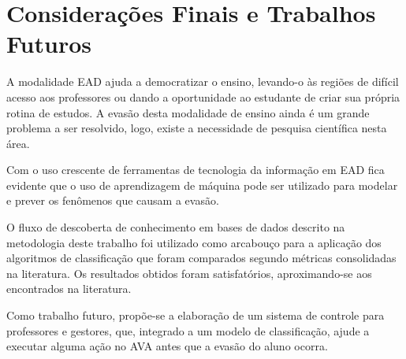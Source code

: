 \chapter{Considerações Finais e Trabalhos Futuros}

A modalidade EAD ajuda a democratizar o ensino, levando-o às regiões de difícil
acesso aos professores ou dando a oportunidade ao estudante de criar sua própria
rotina de estudos. A evasão desta modalidade de ensino ainda é um grande
problema a ser resolvido, logo, existe a necessidade de pesquisa científica
nesta área.

Com o uso crescente de ferramentas de tecnologia da informação em EAD fica
evidente que o uso de aprendizagem de máquina pode ser utilizado para modelar e
prever os fenômenos que causam a evasão.

O fluxo de descoberta de conhecimento em bases de dados descrito na metodologia
deste trabalho foi utilizado como arcabouço para a aplicação dos algoritmos de
classificação que foram comparados segundo métricas consolidadas na literatura.
Os resultados obtidos foram satisfatórios, aproximando-se aos encontrados na
literatura.

Como trabalho futuro, propõe-se a elaboração de um sistema de controle para
professores e gestores, que, integrado a um modelo de classificação, ajude a
executar alguma ação no AVA antes que a evasão do aluno ocorra.